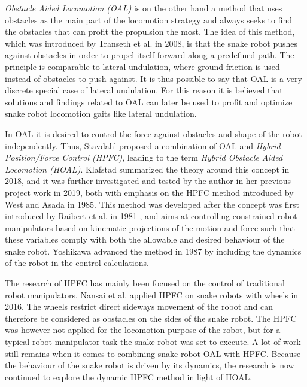 \textit{Obstacle Aided Locomotion (OAL)} is on the other hand a method that uses obstacles as the main part of the locomotion strategy and always seeks to find the obstacles that can profit the propulsion the most. The idea of this method, which was introduced by Transeth et al. \cite{transeth2008snake} in 2008, is that the snake robot pushes against obstacles in order to propel itself forward along a predefined path. The principle is comparable to lateral undulation, where ground friction is used instead of obstacles to push against. It is thus possible to say that OAL is a very discrete special case of lateral undulation. For this reason it is believed that solutions and findings related to OAL can later be used to profit and optimize snake robot locomotion gaits like lateral undulation.


In OAL it is desired to control the force against obstacles and shape of the robot independently. Thus, Stavdahl \cite{StavdahlNote} proposed a combination of OAL and \textit{Hybrid Position/Force Control (HPFC)}, leading to the term \textit{Hybrid Obstacle Aided Locomotion (HOAL)}. Klafstad \cite{TorjusOppg} summarized the theory around this concept in 2018, and it was further investigated and tested by the author in her previous project work \cite{AtussaProsjektoppgp} in 2019, both with emphasis on the HPFC method introduced by West and Asada \cite{west1985method} in 1985. This method was developed after the concept was first introduced by Raibert et al. in 1981 \cite{raibert1981hybrid}, and aims at controlling constrained robot manipulators based on kinematic projections of the motion and force such that these variables comply with both the allowable and desired behaviour of the snake robot. Yoshikawa \cite{yoshikawa1987dynamic} advanced the method in 1987 by including the dynamics of the robot in the control calculations.

The research of HPFC has mainly been focused on the control of traditional robot manipulators. Nansai et al. \cite{nansai2016dynamic} applied HPFC on snake robots with wheels in 2016. The wheels restrict direct sideways movement of the robot and can therefore be considered as obstacles on the sides of the snake robot. The HPFC was however not applied for the locomotion purpose of the robot, but for a typical robot manipulator task the snake robot was set to execute. A lot of work still remains when it comes to combining snake robot OAL with HPFC. Because the behaviour of the snake robot is driven by its dynamics, the research is now continued to explore the dynamic HPFC method in light of HOAL.



